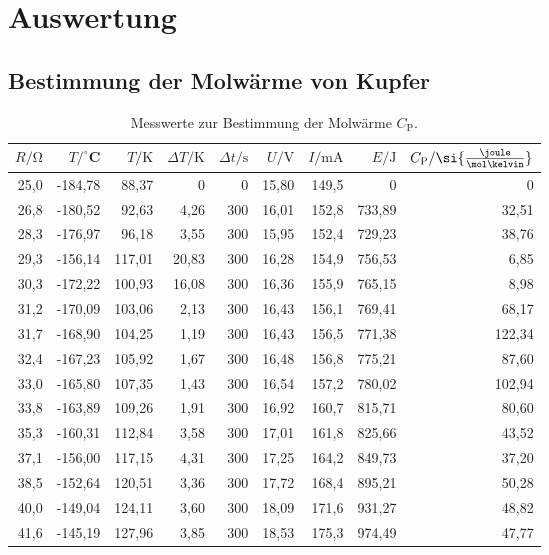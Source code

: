 \section{Auswertung}
\label{sec:Auswertung}

\subsection{Bestimmung der Molwärme von Kupfer}
\begin{table}[htpb]
	\centering
	\caption{Messwerte zur Bestimmung der Molwärme $C_\text{P}$.}
	\label{tab:messwerte}
	\begin{tabular}{rrrr|rrrr|r}
		\toprule
		$R/\si{\ohm}$	&	$T/^\circ$C	&	$T/\si{\kelvin}$	&	$\Delta T/\si{\kelvin}$	&	$\Delta t/\si{\second}$	&	$U/\si{\volt}$	&	$I/\si{\milli\ampere}$	&	$E/\si{\joule}$	& $C_\text{P}/\si{\frac{\joule}{\mol\kelvin}}$\\
		\hline
		25,0	&	-184,78	&	88,37	&	0	&	0	&	15,80	&	149,5	&	0	&	0	\\
		26,8	&	-180,52	&	92,63	&	4,26	&	300	&	16,01	&	152,8	&	733,89	&	32,51	\\
		28,3	&	-176,97	&	96,18	&	3,55	&	300	&	15,95	&	152,4	&	729,23	&	38,76	\\
		29,3	&	-156,14	&	117,01	&	20,83	&	300	&	16,28	&	154,9	&	756,53	&	6,85	\\
		30,3	&	-172,22	&	100,93	&	16,08	&	300	&	16,36	&	155,9	&	765,15	&	8,98	\\
		31,2	&	-170,09 &	103,06	&	2,13	&	300	&	16,43	&	156,1	&	769,41	&	68,17	\\
		31,7	&	-168,90	&	104,25	&	1,19	&	300	&	16,43	&	156,5	&	771,38	&	122,34	\\
		32,4	&	-167,23	&	105,92	&	1,67	&	300	&	16,48	&	156,8	&	775,21	&	87,60	\\
		33,0	&	-165,80 &	107,35	&	1,43	&	300	&	16,54	&	157,2	&	780,02	&	102,94	\\
		33,8	&	-163,89	&	109,26	&	1,91	&	300 &	16,92	&	160,7	&	815,71	&	80,60	\\
		35,3	&	-160,31	&	112,84	&	3,58	&	300	&	17,01	&	161,8	&	825,66	&	43,52	\\
		37,1	&	-156,00	&	117,15	&	4,31	&	300	&	17,25	&	164,2	&	849,73	&	37,20	\\
		38,5	&	-152,64	&	120,51	&	3,36	&	300	&	17,72	&	168,4	&	895,21	&	50,28	\\
		40,0	&	-149,04	&	124,11	&	3,60	&	300	&	18,09	&	171,6	&	931,27	&	48,82	\\
		41,6	&	-145,19	&	127,96	&	3,85	&	300	&	18,53	&	175,3	&	974,49	&	47,77	\\

\end{tabular}
\end{table}
